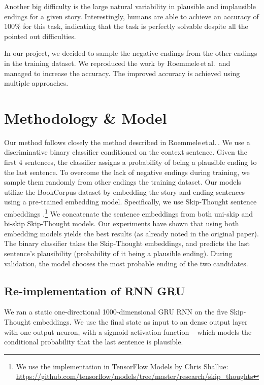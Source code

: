 \documentclass{article}
\begin{document}
Another big difficulty is the large natural variability in plausible and implausible endings for a given story. Interestingly, humans are able to achieve an accuracy of 100\% for this task, indicating that the task is perfectly solvable despite all the pointed out difficulties.

In our project, we decided to sample the negative endings from the other endings in the training dataset. We reproduced the work by Roemmele\,et\,al.\,\citep{Roemmele2017AnTest} and managed to increase the accuracy. The improved accuracy is achieved using multiple approaches.



\section{Methodology \& Model}\label{sec:methodology}
Our method follows closely the method described in Roemmele\,et\,al.\,\citep{Roemmele2017AnTest}. We use a discriminative binary classifier conditioned on the context sentence. Given the first 4 sentences, the classifier assigns a probability of being a plausible ending to the last sentence. To overcome the lack of negative endings during training, we sample them randomly from other endings the training dataset. Our models utilize the BookCorpus \citep{Zhu2015AligningBooks} dataset by embedding the story and ending sentences using a pre-trained embedding model. Specifically, we use Skip-Thought sentence embeddings \citep{Kiros2015Skip-ThoughtVectors}.\footnote{We use the implementation in TensorFlow Models by Chris Shallue: \url{https://github.com/tensorflow/models/tree/master/research/skip_thoughts}} We concatenate the sentence embeddings from both uni-skip and bi-skip Skip-Thought models. Our experiments have shown that using both embedding models yields the best results (as already noted in the original paper). The binary classifier takes the Skip-Thought embeddings, and predicts the last sentence's plausibility (probability of it being a plausible ending). During validation, the model chooses the most probable ending of the two candidates.

\subsection{Re-implementation of RNN GRU}
We ran a static one-directional 1000-dimensional GRU RNN on the five Skip-Thought embeddings. We use the final state as input to an dense output layer with one output neuron, with a sigmoid activation function -- which models the conditional probability that the last sentence is plausible.
\end{document}
